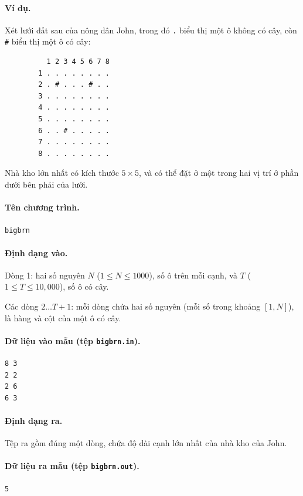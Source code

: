 \documentclass[11pt]{article}
\begin{document}
\paragraph{Ví dụ.}
Xét lưới đất sau của nông dân John, trong đó \texttt{.} biểu thị một ô không
có cây, còn \texttt{\#} biểu thị một ô có cây:
\begin{verbatim}
          1 2 3 4 5 6 7 8
        1 . . . . . . . .
        2 . # . . . # . .
        3 . . . . . . . .
        4 . . . . . . . .
        5 . . . . . . . .
        6 . . # . . . . .
        7 . . . . . . . .
        8 . . . . . . . .
\end{verbatim}
Nhà kho lớn nhất có kích thước \(5\times 5\), và có thể đặt ở một trong hai vị
trí ở phần dưới bên phải của lưới.

\paragraph{Tên chương trình.}
\texttt{bigbrn}

\paragraph{Định dạng vào.}
Dòng 1: hai số nguyên \(N\) (\(1 \le N \le 1000\)), số ô trên mỗi cạnh, và
\(T\) (\(1 \le T \le 10{,}000\)), số ô có cây.

Các dòng \(2\ldots T+1\): mỗi dòng chứa hai số nguyên (mỗi số trong khoảng
\([1,N]\)), là hàng và cột của một ô có cây.

\paragraph{Dữ liệu vào mẫu (tệp \texttt{bigbrn.in}).}
\begin{verbatim}
8 3
2 2
2 6
6 3
\end{verbatim}

\paragraph{Định dạng ra.}
Tệp ra gồm đúng một dòng, chứa độ dài cạnh lớn nhất của nhà kho của John.

\paragraph{Dữ liệu ra mẫu (tệp \texttt{bigbrn.out}).}
\begin{verbatim}
5
\end{verbatim}
\end{document}
